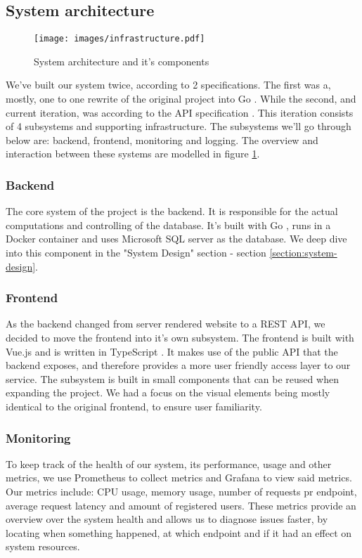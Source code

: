 \subsection{System architecture}
\begin{figure}[h]
    \centering
    \texttt{[image: images/infrastructure.pdf]}
    \caption{System architecture and it's components}
    \label{fig:architecture}
\end{figure}

We've built our system twice, according to 2 specifications. The first was a, mostly, one to one rewrite of the original project into Go \cite{tool:go}.
While the second, and current iteration, was according to the API specification \cite{spec:api}. 
This iteration consists of 4 subsystems and supporting infrastructure. The subsystems we'll go through below are: backend, frontend, monitoring and logging.
The overview and interaction between these systems are modelled in figure \ref{fig:architecture}.

\subsubsection{Backend}
The core system of the project is the backend. It is responsible for the actual computations and controlling of the database.
It's built with Go \cite{tool:go}, runs in a Docker container and uses Microsoft SQL server \cite{tool:microsoft-sql-server} as the database. We deep dive into this component in the "System Design" section - section \ref{section:system-design}.

\subsubsection{Frontend}
As the backend changed from server rendered website to a REST API, we decided to move the frontend into it's own subsystem.
The frontend is built with Vue.js \cite{tool:vue} and is written in TypeScript \cite{tool:typescript}.
It makes use of the public API that the backend exposes, and therefore provides a more user friendly access layer to our service.
The subsystem is built in small components that can be reused when expanding the project. We had a focus on the visual elements being mostly identical to the original frontend, to ensure user familiarity.

\subsubsection{Monitoring}
To keep track of the health of our system, its performance, usage and other metrics, we use Prometheus \cite{tool:prometheus} to collect metrics and Grafana \cite{tool:grafana} to view said metrics.
Our metrics include: CPU usage, memory usage, number of requests pr endpoint, average request latency and amount of registered users.
These metrics provide an overview over the system health and allows us to diagnose issues faster, by locating when something happened, at which endpoint and if it had an effect on system resources.

